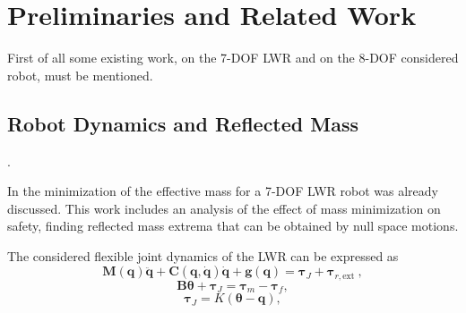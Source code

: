 \chapter{Preliminaries and Related Work}
\label{ch:Previouswork}


First of all some existing work, on the 7-DOF LWR and on the 8-DOF considered robot, must be mentioned.

\section{Robot Dynamics and Reflected Mass}
\label{sec:Nicostuff}
\label{sec:refl_mass_nico}

.


In \cite{paper_iros2017} the  minimization of the effective mass for a 7-DOF LWR robot was already discussed. This work includes an analysis of the effect of mass minimization on safety, finding reflected mass extrema that can be obtained by null space motions. 





The considered flexible joint dynamics of the LWR can be expressed as
\begin{equation}
\mathbf{M} (\mathbf{q}) \ddot{\mathbf{q}} + \mathbf{C}(\mathbf{q}, \dot{\mathbf{q}}) \dot{\mathbf{q}} + \mathbf{g}(\mathbf{q})  = \mathbf{\tau}_J + \mathbf{\tau}_{r,\mathrm{ext}} \label{eq:flex_dyn_1}  \ ,
\end{equation}
\begin{equation}
\mathbf{B} \mathbf{\theta} + \mathbf{\tau}_J  = \mathbf{\tau}_m - \mathbf{\tau}_f   ,
\end{equation}
\begin{equation}
\mathbf{\tau}_J  = K(\mathbf{\theta} - \mathbf{q})  , 
\end{equation}

